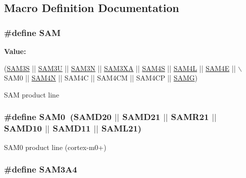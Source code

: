 \subsection{Macro Definition Documentation}
\hypertarget{group__sam__part__macros__group_ga0184d5fd98854f0e40eef3a27de91fed}{
\subsubsection[{S\-A\-M}]{\setlength{\rightskip}{0pt plus 5cm}\#define S\-A\-M}}\label{group__sam__part__macros__group_ga0184d5fd98854f0e40eef3a27de91fed}
{\bfseries Value\-:}
\begin{DoxyCode}
(\hyperlink{group__sam__part__macros__group_gaaa8d9ee5981c67997fbdf923247bcb68}{SAM3S} || \hyperlink{group__sam__part__macros__group_ga987abac1ef39b0b447b8b11419942476}{SAM3U} || \hyperlink{group__sam__part__macros__group_ga52239420b96aa3f1a273665cfd3b60a1}{SAM3N} || \hyperlink{group__sam__part__macros__group_gaae4990dfaa4eeed17d8a0351cca02fdd}{SAM3XA} || \hyperlink{group__sam__part__macros__group_gac3e6ef71bec5113415a64bb14ce8be24}{SAM4S} || \hyperlink{group__sam__part__macros__group_gabf4b4fa802cbb57480225dd3c8f7a41b}{SAM4L}
       || \hyperlink{group__sam__part__macros__group_ga7266cd2c26bf5ed34a006ed97f34db76}{SAM4E} || \(\backslash\)
                SAM0 || \hyperlink{group__sam__part__macros__group_gadb4c0138a71e1c2dfb0c91ad3ea5861c}{SAM4N} || SAM4C || SAM4CM || SAM4CP || \hyperlink{group__sam__part__macros__group_gad4ae7782abc1e1087067d9958af3381c}{SAMG})
\end{DoxyCode}
S\-A\-M product line \hypertarget{group__sam__part__macros__group_ga5f347b54588ccfc00042a0272f1c0306}{
\subsubsection[{S\-A\-M0}]{\setlength{\rightskip}{0pt plus 5cm}\#define S\-A\-M0~({\bf S\-A\-M\-D20} $|$$|$ {\bf S\-A\-M\-D21} $|$$|$ {\bf S\-A\-M\-R21} $|$$|$ {\bf S\-A\-M\-D10} $|$$|$ {\bf S\-A\-M\-D11} $|$$|$ {\bf S\-A\-M\-L21})}}\label{group__sam__part__macros__group_ga5f347b54588ccfc00042a0272f1c0306}
S\-A\-M0 product line (cortex-\/m0+) \hypertarget{group__sam__part__macros__group_ga1f4481b0cd1b2c1a4636999b6a433b9f}{
\subsubsection[{S\-A\-M3\-A4}]{\setlength{\rightskip}{0pt plus 5cm}\#define S\-A\-M3\-A4}}\label{group__sam__part__macros__group_ga1f4481b0cd1b2c1a4636999b6a433b9f}
